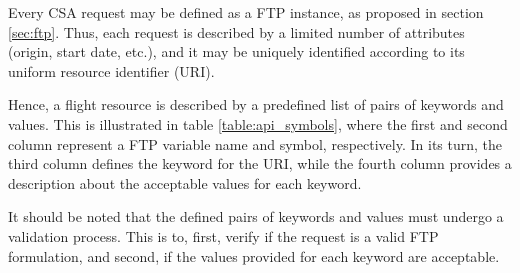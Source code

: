 Every CSA request may be defined as a FTP instance, as proposed in section \ref{sec:ftp}. Thus, each request is described by a limited number of attributes (origin, start date, etc.),  and it may be uniquely identified according to its uniform resource identifier (URI). 

Hence, a flight resource is described by a predefined list of pairs of keywords and values. This is illustrated in table  \ref{table:api_symbols}, where the first and second column represent a FTP variable name and symbol, respectively. In its turn, the third column defines the keyword for the URI, while the fourth column provides a description about the acceptable values for each keyword. 

It should be noted that the defined pairs of keywords and values must undergo a validation process. This is to, first, verify if the request is a valid FTP formulation, and second, if the values provided for each keyword are acceptable.  



